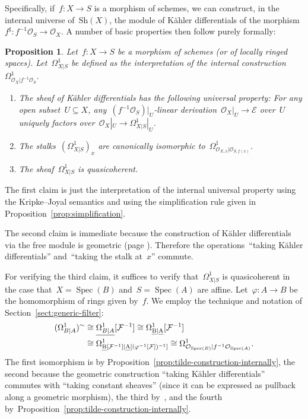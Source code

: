 \documentclass[10pt,reqno,a4paper]{amsbook}
\makeatletter
\theoremstyle{definition}
\theoremstyle{plain}
\newtheorem{prop}[defn]{Proposition}
\theoremstyle{remark}
\newcommand{\E}{\mathcal{E}}
\newcommand{\F}{\mathcal{F}}
\renewcommand{\O}{\mathcal{O}}
\let\oldul\ul
\renewcommand{\ul}[1]{\text{\oldul{$#1$}}}
\newcommand{\Sh}{\mathrm{Sh}}
\DeclareMathOperator{\Spec}{Spec}
\newcommand{\?}{\,{:}\,}
\renewcommand{\_}{\mathpunct{.}\,}
\newcommand{\stacksproject}[1]{\cite[{\href{http://stacks.math.columbia.edu/tag/#1}{Tag~#1}}]{stacks-project}}
\renewenvironment{proof}[1][\proofname]{\par
  \pushQED{\qed}%
  \normalfont \topsep6\p@\@plus6\p@\relax
  \trivlist
  \item[\hskip\labelsep
        \itshape
    #1\@addpunct{.}]\ignorespaces
}{%
  \popQED\endtrivlist\@endpefalse
}
\makeatother
\begin{document}
Specifically, if~$f : X \to S$ is a morphism of schemes, we can construct, in
the internal universe of~$\Sh(X)$, the module of Kähler differentials of the
morphism~$f^\sharp : f^{-1}\O_S \to \O_X$. A number of basic properties then
follow purely formally:

\begin{prop}Let~$f : X \to S$ be a morphism of schemes (or of locally ringed
spaces). Let~$\Omega^1_{X|S}$ be defined as the interpretation of the internal
construction~$\Omega^1_{\O_X|f^{-1}\O_S}$.
\begin{enumerate}
\item The sheaf of Kähler differentials has the following universal property:
For any open subset~$U \subseteq X$, any~$(f^{-1}\O_S)|_U$-linear
derivation~$\O_X|_U \to \E$ over~$U$ uniquely factors over~$\O_X|_U \to
\Omega^1_{X|S}|_U$.
\item The stalks~$(\Omega^1_{X|S})_x$ are canonically isomorphic
to~$\Omega^1_{\O_{X,x}|\O_{S,f(x)}}$.
\item The sheaf~$\Omega^1_{X|S}$ is quasicoherent.
\end{enumerate}
\end{prop}

\begin{proof}The first claim is just the interpretation of the internal
universal property using the Kripke--Joyal semantics and using the
simplification rule given in Proposition~\ref{prop:simplification}.

The second claim is immediate because the construction of Kähler differentials
via the free module is geometric (page
\pageref{page:geometric-constructions}). Therefore the operations~``taking
Kähler differentials'' and~``taking the stalk at~$x$'' commute.

For verifying the third claim, it suffices to verify that~$\Omega^1_{X|S}$ is
quasicoherent in the case that~$X = \Spec(B)$ and~$S = \Spec(A)$ are affine.
Let~$\varphi : A \to B$ be the homomorphism of rings given by~$f$. We employ the
technique and notation of Section~\ref{sect:generic-filter}:
\begin{align*}
  (\Omega^1_{B|A})^\sim &\cong
  \underline{\Omega^1_{B|A}}[\F^{-1}] \cong
  \Omega^1_{\ul{B}|\ul{A}}[\F^{-1}] \\
  &\cong
  \Omega^1_{\ul{B}[\F^{-1}]|\ul{A}[(\varphi^{-1}[\F])^{-1}]} \cong
  \Omega^1_{\O_{\Spec(B)}|f^{-1}\O_{\Spec(A)}}.
\end{align*}
The first isomorphism is by
Proposition~\ref{prop:tilde-construction-internally}, the second because the
geometric construction ``taking Kähler differentials'' commutes with ``taking
constant sheaves'' (since it can be expressed as pullback along a geometric
morphism), the third by~\stacksproject{00RT}, and the fourth
by~Proposition~\ref{prop:tilde-construction-internally}.
\end{proof}
\end{document}
